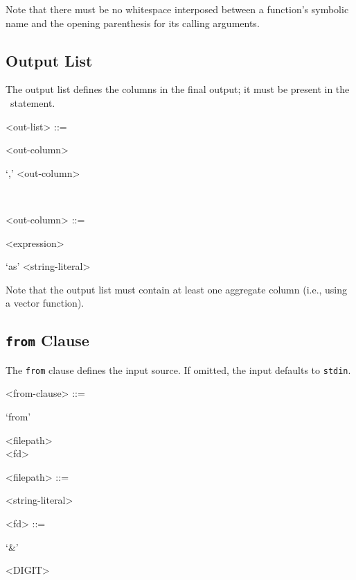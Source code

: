 Note that there must be no whitespace interposed between a function's
symbolic name and the opening parenthesis for its calling arguments.

\subsection{Output List}

The output list defines the columns in the final output; it must be
present in the \stag\ statement.

\begin{grammar}
  <out-list> ::= \begin{syntdiag}
    <out-column>
    \begin{stack}
      \begin{rep}`,' <out-column>\end{rep} \\
    \end{stack}
  \end{syntdiag}

  <out-column> ::= \begin{syntdiag}
    <expression>
    \begin{stack}
      `as' <string-literal> \\
    \end{stack}
  \end{syntdiag}
\end{grammar}

Note that the output list must contain at least one aggregate column
(i.e., using a vector function).

\subsection{\texttt{from} Clause}

The \texttt{from} clause defines the input source. If omitted, the input
defaults to \texttt{stdin}.

\begin{grammar}
  <from-clause> ::= \begin{syntdiag}
    `from'
    \begin{stack}
      <filepath> \\
      <fd>
    \end{stack}
  \end{syntdiag}

  <filepath> ::= \begin{syntdiag}
    <string-literal>
  \end{syntdiag}

  <fd> ::= \begin{syntdiag}
    `\&'
    \begin{rep}
      <DIGIT>
    \end{rep}
  \end{syntdiag}
\end{grammar}


